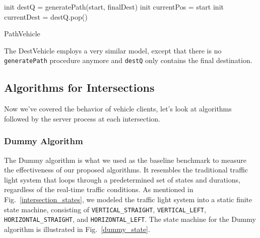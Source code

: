 \documentclass[conference]{IEEEtran}
\begin{document}
\begin{algorithm}
  init destQ = generatePath(start, finalDest)\;
  init currentPos = start\;
  init currentDest = destQ.pop()\;
  


  

  \caption{PathVehicle \label{path_vehicle}}
\end{algorithm}

The DestVehicle employs a very similar model, except that there is no \texttt{generatePath} procedure anymore and \texttt{destQ} only contains the final destination.


\subsection{ Algorithms for Intersections}

Now we've covered the behavior of vehicle clients, let's look at algorithms followed by the server process at each intersection.

\subsubsection{ Dummy Algorithm}

The Dummy algorithm is what we used as the baseline benchmark to measure the effectiveness of our proposed algorithms. It resembles the traditional traffic light system that loops through a predetermined set of states and durations, regardless of the real-time traffic conditions. As mentioned in Fig.~\ref{intersection_states}, we modeled the traffic light system into a static finite state machine, consisting of \texttt{VERTICAL\_STRAIGHT}, \texttt{VERTICAL\_LEFT}, \texttt{HORIZONTAL\_STRAIGHT}, and \texttt{HORIZONTAL\_LEFT}. The state machine for the Dummy algorithm is illustrated in Fig.~\ref{dummy_state}.
\end{document}
